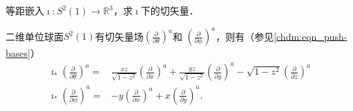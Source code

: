 \begin{example}\label{chsm:exm_Dni}
    等距嵌入$\imath:S^2(1) \to \mathbb{R}^3$，求$\imath$下的切矢量．
\end{example}
二维单位球面$S^2(1)$有切矢量场$(\frac{\partial }{\partial \theta})^a$和
$(\frac{\partial }{\partial \phi})^a$，则有（参见\eqref{chdm:eqn_push-bases}）
\begin{align}
    \imath_{*} \left(\frac{\partial }{\partial \theta}\right)^a 
    =& \frac{xz}{\sqrt{1-z^2}} \left(\frac{\partial }{\partial x}\right)^a
    + \frac{yz}{\sqrt{1-z^2}} \left(\frac{\partial }{\partial y}\right)^a
    - \sqrt{1-z^2} \left(\frac{\partial }{\partial z}\right)^a \label{chsm:eqn_itheta} \\
    \imath_{*} \left(\frac{\partial }{\partial \phi}\right)^a 
    =&- y \left(\frac{\partial }{\partial x}\right)^a
    + x \left(\frac{\partial }{\partial y}\right)^a . \label{chsm:eqn_iphi}
\end{align}

